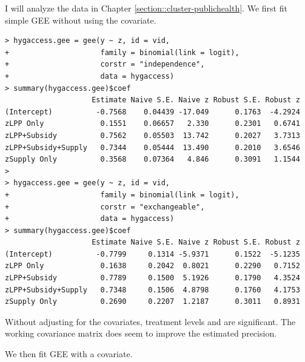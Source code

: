 I will analyze the data in Chapter \ref{section::cluster-publichealth}. 
We first fit simple GEE without using the covariate.
\begin{lstlisting}
> hygaccess.gee = gee(y ~ z, id = vid,
+                     family = binomial(link = logit),
+                     corstr = "independence", 
+                     data = hygaccess)
> summary(hygaccess.gee)$coef
                    Estimate Naive S.E. Naive z Robust S.E. Robust z
(Intercept)          -0.7568    0.04439 -17.049      0.1763  -4.2924
zLPP Only             0.1551    0.06657   2.330      0.2301   0.6741
zLPP+Subsidy          0.7562    0.05503  13.742      0.2027   3.7313
zLPP+Subsidy+Supply   0.7344    0.05444  13.490      0.2010   3.6546
zSupply Only          0.3568    0.07364   4.846      0.3091   1.1544
> 
> hygaccess.gee = gee(y ~ z, id = vid,
+                     family = binomial(link = logit),
+                     corstr = "exchangeable", 
+                     data = hygaccess)
> summary(hygaccess.gee)$coef
                    Estimate Naive S.E. Naive z Robust S.E. Robust z
(Intercept)          -0.7799     0.1314 -5.9371      0.1522  -5.1235
zLPP Only             0.1638     0.2042  0.8021      0.2290   0.7152
zLPP+Subsidy          0.7789     0.1500  5.1926      0.1790   4.3524
zLPP+Subsidy+Supply   0.7348     0.1506  4.8798      0.1760   4.1753
zSupply Only          0.2690     0.2207  1.2187      0.3011   0.8931
\end{lstlisting}


Without adjusting for the covariates, treatment levels    and  are significant. The  working covariance matrix does seem to improve the estimated precision. 


We then fit GEE with a covariate. 

